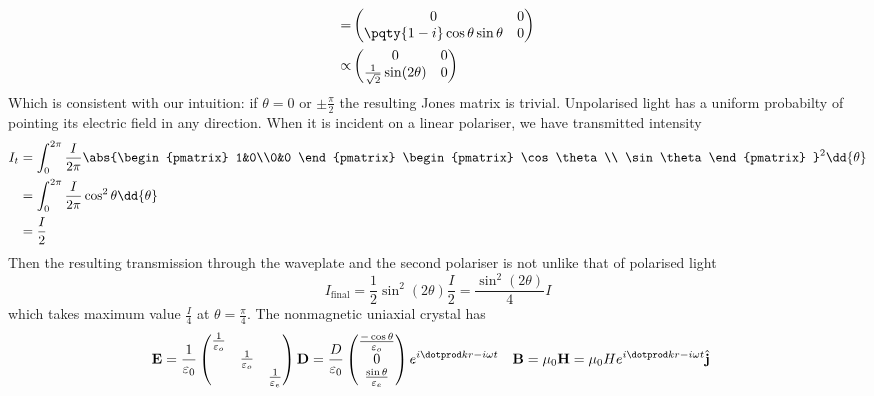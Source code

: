 \documentclass[12pt]{extarticle}
\renewcommand{\bf}{\mathbf}
\begin{document}
\begin{outline}[enumerate]
\begin{align*}
            =&\begin{pmatrix} 0 & 0 \\ \pqty{1 - i}\cos\theta \sin\theta &0 \end{pmatrix}\\
            \propto&\begin{pmatrix} 0 & 0 \\ \frac{1}{\sqrt{2}}\sin(2\theta) &0 \end{pmatrix}
        \end{align*}
        Which is consistent with our intuition: if \(\theta = 0\) or \(\pm\frac{\pi}{2}\) the resulting Jones matrix is trivial.
        \2 Unpolarised light has a uniform probabilty of pointing its electric field in any direction. When it is incident on a linear polariser, we have transmitted intensity 
        \begin{align*}
            I_t &= \int_0^{2\pi}\frac{I}{2\pi} \abs{\begin{pmatrix} 1&0\\0&0 \end{pmatrix} \begin{pmatrix} \cos\theta \\ \sin\theta  \end{pmatrix} }^2\dd{\theta }\\
            &= \int_0^{2\pi}\frac{I}{2\pi} \cos^2\theta \dd{\theta } \\
            &= \frac{I}{2}
        \end{align*}
        Then the resulting transmission through the waveplate and the second polariser is not unlike that of polarised light
        \[
            I_\text{final} = \frac{1}{2}\sin^2(2\theta )\frac{I}{2} = \frac{\sin^2(2\theta )}{4} I
        \]
        which takes maximum value \(\frac{I}{4}\) at \(\theta = \frac{\pi}{4}\).
        \1 
        \2 The nonmagnetic uniaxial crystal has \begin{align*}
            \bf E &= \frac{1}{\varepsilon_0}\begin{pmatrix} \frac{1}{\varepsilon_o}\\ &\frac{1}{\varepsilon_o}\\ &&\frac{1}{\varepsilon_e} \end{pmatrix} \bf D = \frac{D}{\varepsilon_0}\begin{pmatrix} \frac{ - \cos\theta }{\varepsilon_o}\\0\\\frac{\sin\theta }{\varepsilon_e} \end{pmatrix} e^{i \dotprod kr - i\omega t}& \bf B &= \mu_0 \bf H = \mu_0 H e^{i \dotprod kr - i\omega t}\hat{\bf j}

\end{align*}
\end{outline}
\end{document}
